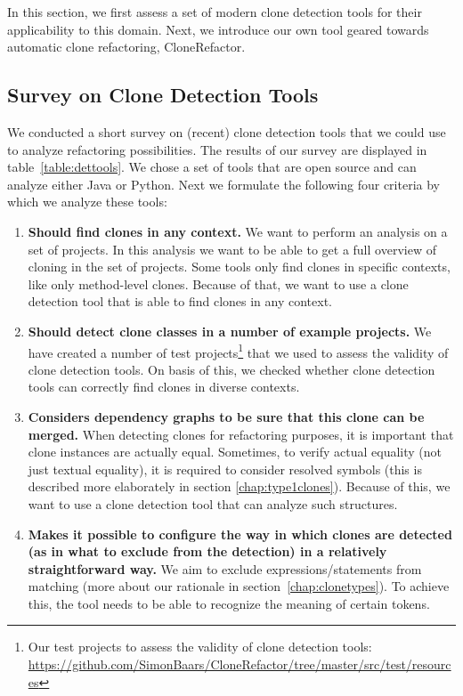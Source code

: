 \documentclass[a4paper]{article}
\begin{document}
In this section, we first assess a set of modern clone detection tools for their applicability to this domain. Next, we introduce our own tool geared towards automatic clone refactoring, CloneRefactor.%

\subsection{Survey on Clone Detection Tools}
\label{ch:tool-overview}
We conducted a short survey on (recent) clone detection tools that we could use to analyze refactoring possibilities. The results of our survey are displayed in table~\ref{table:dettools}. We chose a set of tools that are open source and can analyze either Java or Python. Next we formulate the following four criteria by which we analyze these tools:
\begin{enumerate}
    \item \textbf{Should find clones in any context.} We want to perform an analysis on a set of projects. In this analysis we want to be able to get a full overview of cloning in the set of projects. Some tools only find clones in specific contexts, like only method-level clones. Because of that, we want to use a clone detection tool that is able to find clones in any context.
\item \textbf{Should detect clone classes in a number of example projects.} We have created a number of test projects\footnote{Our test projects to assess the validity of clone detection tools: \url{https://github.com/SimonBaars/CloneRefactor/tree/master/src/test/resources}} that we used to assess the validity of clone detection tools. On basis of this, we checked whether clone detection tools can correctly find clones in diverse contexts.
\item \textbf{Considers dependency graphs to be sure that this clone can be merged.} When detecting clones for refactoring purposes, it is important that clone instances are actually equal. Sometimes, to verify actual equality (not just textual equality), it is required to consider resolved symbols (this is described more elaborately in section \ref{chap:type1clones}). Because of this, we want to use a clone detection tool that can analyze such structures.
\item \textbf{Makes it possible to configure the way in which clones are detected (as in what to exclude from the detection) in a relatively straightforward way.} We aim to exclude expressions/statements from matching (more about our rationale in section~\ref{chap:clonetypes}). To achieve this, the tool needs to be able to recognize the meaning of certain tokens.
\end{enumerate}
\end{document}
